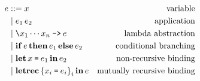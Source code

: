 \documentclass[12pt]{article}
\begin{document}
\pagestyle{empty}

\begin{align*}
  e
  &\mathrel{::=} x &\mbox{variable} \\
  &\mid e_1 \, e_2 &\mbox{application} \\
  &\mid \text{\texttt{\textbackslash}} x_1 \cdots x_n \mathbin{\text{\texttt{->}}} e &\mbox{lambda abstraction} \\
  &\mid \mathop{\mathbf{if}} e \mathop{\mathbf{then}} e_1 \mathop{\mathbf{else}} e_2 &\mbox{conditional branching} \\
  &\mid \mathop{\mathbf{let}} x \mathbin{\text{\texttt{=}}} e_1 \mathop{\mathbf{in}} e_2 &\mbox{non-recursive binding} \\
  &\mid \mathop{\mathbf{letrec}} {\{ x_i \mathbin{\text{\texttt{=}}} e_i \}}_i \mathop{\mathbf{in}} e &\mbox{mutually recursive binding}
\end{align*}
\end{document}
